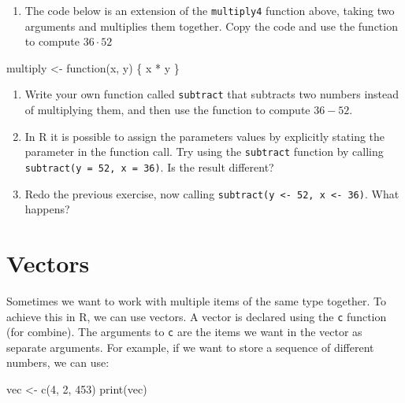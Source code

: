 \documentclass[
  letterpaper,
  DIV=11,
  numbers=noendperiod]{scrreprt}
\newenvironment{Shaded}{\begin{snugshade}}{\end{snugshade}}
\newcommand{\ControlFlowTok}[1]{\textcolor[rgb]{0.00,0.23,0.31}{#1}}
\newcommand{\DecValTok}[1]{\textcolor[rgb]{0.68,0.00,0.00}{#1}}
\newcommand{\FunctionTok}[1]{\textcolor[rgb]{0.28,0.35,0.67}{#1}}
\newcommand{\NormalTok}[1]{\textcolor[rgb]{0.00,0.23,0.31}{#1}}
\newcommand{\OtherTok}[1]{\textcolor[rgb]{0.00,0.23,0.31}{#1}}
\newcommand{\SpecialCharTok}[1]{\textcolor[rgb]{0.37,0.37,0.37}{#1}}
\providecommand{\tightlist}{%
  \setlength{\itemsep}{0pt}\setlength{\parskip}{0pt}}\usepackage{longtable,booktabs,array}
\begin{document}
\begin{enumerate}
\def\labelenumi{\arabic{enumi}.}
\tightlist
\item
  The code below is an extension of the \texttt{multiply4} function
  above, taking two arguments and multiplies them together. Copy the
  code and use the function to compute \(36 \cdot 52\)
\end{enumerate}

\begin{Shaded}
\begin{Highlighting}[]
\NormalTok{multiply }\OtherTok{\textless{}{-}} \ControlFlowTok{function}\NormalTok{(x, y) \{}
\NormalTok{  x }\SpecialCharTok{*}\NormalTok{ y}
\NormalTok{\}}
\end{Highlighting}
\end{Shaded}

\begin{enumerate}
\def\labelenumi{\arabic{enumi}.}
\setcounter{enumi}{1}
\tightlist
\item
  Write your own function called \texttt{subtract} that subtracts two
  numbers instead of multiplying them, and then use the function to
  compute \(36 - 52\).
\item
  In R it is possible to assign the parameters values by explicitly
  stating the parameter in the function call. Try using the
  \texttt{subtract} function by calling
  \texttt{subtract(y\ =\ 52,\ x\ =\ 36)}. Is the result different?
\item
  Redo the previous exercise, now calling
  \texttt{subtract(y\ \textless{}-\ 52,\ x\ \textless{}-\ 36)}. What
  happens?
\end{enumerate}

\section{Vectors}\label{vectors}

Sometimes we want to work with multiple items of the same type together.
To achieve this in R, we can use vectors. A vector is declared using the
\texttt{c} function (for combine). The arguments to \texttt{c} are the
items we want in the vector as separate arguments. For example, if we
want to store a sequence of different numbers, we can use:

\begin{Shaded}
\begin{Highlighting}[]
\NormalTok{vec }\OtherTok{\textless{}{-}} \FunctionTok{c}\NormalTok{(}\DecValTok{4}\NormalTok{, }\DecValTok{2}\NormalTok{, }\DecValTok{453}\NormalTok{)}
\FunctionTok{print}\NormalTok{(vec)}
\end{Highlighting}
\end{Shaded}
\end{document}

